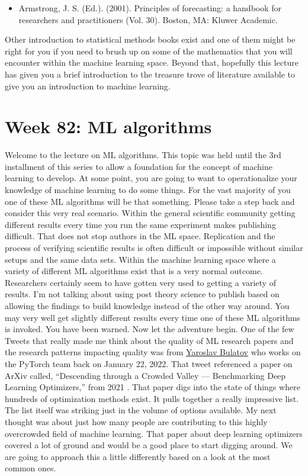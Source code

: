 \documentclass{article}
\begin{document}
\begin{itemize}
\item Armstrong, J. S. (Ed.). (2001). Principles of forecasting: a handbook for researchers and practitioners (Vol. 30). Boston, MA: Kluwer Academic. \cite{armstrong2001principles}
\end{itemize}

Other introduction to statistical methods books exist and one of them might be right for you if you need to brush up on some of the mathematics that you will encounter within the machine learning space. Beyond that, hopefully this lecture has given you a brief introduction to the treasure trove of literature available to give you an introduction to machine learning. 

\section{Week 82: ML algorithms}
Welcome to the lecture on ML algorithms. This topic was held until the 3rd installment of this series to allow a foundation for the concept of machine learning to develop. At some point, you are going to want to operationalize your knowledge of machine learning to do some things. For the vast majority of you one of these ML algorithms will be that something. Please take a step back and consider this very real scenario. Within the general scientific community getting different results every time you run the same experiment makes publishing difficult. That does not stop authors in the ML space. Replication and the process of verifying scientific results is often difficult or impossible without similar setups and the same data sets. Within the machine learning space where a variety of different ML algorithms exist that is a very normal outcome. Researchers certainly seem to have gotten very used to getting a variety of results. I’m not talking about using post theory science to publish based on allowing the findings to build knowledge instead of the other way around. You may very well get slightly different results every time one of these ML algorithms is invoked. You have been warned. Now let the adventure begin. 
One of the few Tweets that really made me think about the quality of ML research papers and the research patterns impacting quality was from \href{https://twitter.com/yaroslavvb/status/1484968489014104065}{Yaroslav Bulatov} who works on the PyTorch team back on January 22, 2022. That tweet referenced a paper on ArXiv called, “Descending through a Crowded Valley — Benchmarking Deep Learning Optimizers,” from 2021 \cite{schmidt2021descending}. That paper digs into the state of things where hundreds of optimization methods exist. It pulls together a really impressive list. The list itself was striking just in the volume of options available. My next thought was about just how many people are contributing to this highly overcrowded field of machine learning. That paper about deep learning optimizers covered a lot of ground and would be a good place to start digging around. We are going to approach this a little differently based on a look at the most common ones. 
\end{document}
